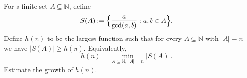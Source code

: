 For a finite set $A\subseteq\mathbb N$, define
\[
S(A):=\Bigl\{\frac{a}{\gcd(a,b)}: a,b\in A\Bigr\}.
\]
Define $h(n)$ to be the largest function such that for every $A\subseteq\mathbb N$ with $|A|=n$ we have $|S(A)|\ge h(n)$.
Equivalently,
\[
 h(n)=\min_{A\subseteq\mathbb N,\ |A|=n} |S(A)|.
\]
Estimate the growth of $h(n)$.
